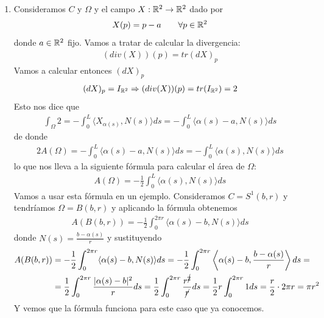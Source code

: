 \begin{observacion}
\begin{enumerate}[start=4]
        \item Consideramos $C$ y $\Omega$ y el campo $X:\mathbb{R}^2 \to \mathbb{R}^2$ dado por 
        \begin{gather*}
            X(p)=p-a \qquad \forall p \in \mathbb{R}^2
        \end{gather*}
        donde $a\in \mathbb{R}^2$ fijo. Vamos a tratar de calcular la divergencia:
        \begin{gather*}
            (div(X))(p) = tr(dX)_p
        \end{gather*}
        Vamos a calcular entonces $(dX)_p$
        \begin{gather*}
            (dX)_p = I_{\mathbb{R}^2} \Rightarrow (div(X))(p) = tr(I_{\mathbb{R}^2})=2
        \end{gather*}
        Esto nos dice que 
        \begin{gather*}
            \int_\Omega 2 = - \int_0^L \langle X_{\alpha(s)}, N(s) \rangle ds = -\int_0^L \langle \alpha(s)-a, N(s) \rangle ds
        \end{gather*}
        de donde
        \begin{gather*}
            2A(\Omega) =  -\int_0^L \langle \alpha(s)-a, N(s) \rangle ds = -\int_0^L \langle \alpha(s), N(s) \rangle ds
        \end{gather*}
        lo que nos lleva a la siguiente fórmula para calcular el área de $\Omega$:
        \begin{gather*}
            \boxed{A(\Omega) = -\frac{1}{2} \int_0^L \langle \alpha(s), N(s)\rangle ds}
        \end{gather*}
        Vamos a usar esta fórmula en un ejemplo. Consideramos $C=S^1(b, r)$ y tendríamos $\Omega = B(b,r)$ y aplicando la fórmula obtenemos
        \begin{gather*}
            A(B(b,r)) = - \frac{1}{2} \int_0^{2\pi r} \langle \alpha(s)-b, N(s)\rangle ds
        \end{gather*}
        donde $N(s) = \frac{b-\alpha(s)}{r}$ y sustituyendo
        \begin{align*}
            A(B(b,r)) &= - \frac{1}{2} \int_0^{2\pi r} \langle \alpha(s)-b, N(s)\rangle ds = - \frac{1}{2} \int_0^{2\pi r} \left\langle \alpha(s)-b, \frac{b-\alpha(s)}{r}\right\rangle ds =\\
            &= \frac{1}{2} \int_0^{2\pi r} \frac{|\alpha(s)-b|^2}{r} ds = \frac{1}{2} \int_0^{2\pi r} \frac{r^{\cancel{2}}}{\cancel{r}} ds = \frac{1}{{2}} r \int_0^{2\pi r} 1ds = \frac{r}{2}\cdot 2\pi r = \pi r^2
        \end{align*}
        Y vemos que la fórmula funciona para este caso que ya conocemos.


\end{enumerate}
\end{observacion}
